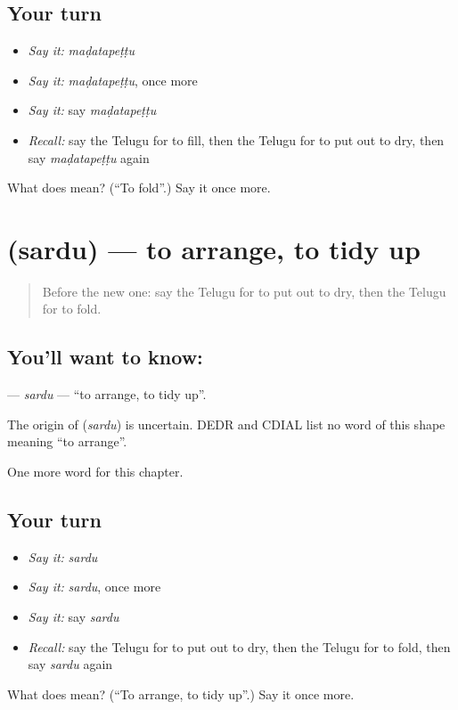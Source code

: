 \subsection*{Your turn}
\begin{itemize}
\raggedright
  \item \emph{Say it:} \emph{maḍatapeṭṭu}
  \item \emph{Say it:} \emph{maḍatapeṭṭu}, once more
  \item \emph{Say it:} say \emph{maḍatapeṭṭu}
  \item \emph{Recall:} say the Telugu for to fill, then the Telugu for to put out to dry, then say \emph{maḍatapeṭṭu} again
\end{itemize}

\begin{tcolorbox}[breakable,colback=teal!4,colframe=teal!35!black,title={Before you move on}]
What does  mean? (\textquotedblleft{}To fold\textquotedblright{}.) Say it once more.
\end{tcolorbox}
\section[\texorpdfstring{\te{సర్దు} (sardu)}{సర్దు (sardu)}]{ (sardu) — to arrange, to tidy up}

\label{lesson:TE-C199-sardu}



\begin{quote}
Before the new one: say the Telugu for to put out to dry, then the Telugu for to fold.
\end{quote}

\subsection*{You'll want to know: }
\textbf{} — \emph{sardu} — \textquotedblleft{}to arrange, to tidy up\textquotedblright{}.

\begin{cousinweb}
The origin of \textbf{} (\emph{sardu}) is uncertain. DEDR and CDIAL list no word of this shape meaning \textquotedblleft{}to arrange\textquotedblright{}.
\end{cousinweb}

\begin{grammarlens}[title={What you've built}]
One more word for this chapter.
\end{grammarlens}

\subsection*{Your turn}
\begin{itemize}
\raggedright
  \item \emph{Say it:} \emph{sardu}
  \item \emph{Say it:} \emph{sardu}, once more
  \item \emph{Say it:} say \emph{sardu}
  \item \emph{Recall:} say the Telugu for to put out to dry, then the Telugu for to fold, then say \emph{sardu} again
\end{itemize}

\begin{tcolorbox}[breakable,colback=teal!4,colframe=teal!35!black,title={Before you move on}]
What does  mean? (\textquotedblleft{}To arrange, to tidy up\textquotedblright{}.) Say it once more.
\end{tcolorbox}
